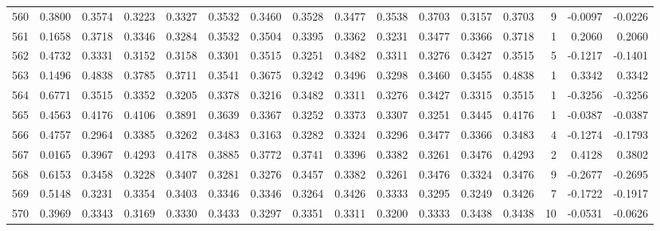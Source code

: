 \begin{tabular}{lrrrrrrrrrrrrrrr}
560 &      0.3800 &  0.3574 &  0.3223 &  0.3327 &  0.3532 &  0.3460 &  0.3528 &  0.3477 &  0.3538 &  0.3703 &   0.3157 &     0.3703 &      9 &                   -0.0097 &                    -0.0226 \\
561 &      0.1658 &  0.3718 &  0.3346 &  0.3284 &  0.3532 &  0.3504 &  0.3395 &  0.3362 &  0.3231 &  0.3477 &   0.3366 &     0.3718 &      1 &                    0.2060 &                     0.2060 \\
562 &      0.4732 &  0.3331 &  0.3152 &  0.3158 &  0.3301 &  0.3515 &  0.3251 &  0.3482 &  0.3311 &  0.3276 &   0.3427 &     0.3515 &      5 &                   -0.1217 &                    -0.1401 \\
563 &      0.1496 &  0.4838 &  0.3785 &  0.3711 &  0.3541 &  0.3675 &  0.3242 &  0.3496 &  0.3298 &  0.3460 &   0.3455 &     0.4838 &      1 &                    0.3342 &                     0.3342 \\
564 &      0.6771 &  0.3515 &  0.3352 &  0.3205 &  0.3378 &  0.3216 &  0.3482 &  0.3311 &  0.3276 &  0.3427 &   0.3315 &     0.3515 &      1 &                   -0.3256 &                    -0.3256 \\
565 &      0.4563 &  0.4176 &  0.4106 &  0.3891 &  0.3639 &  0.3367 &  0.3252 &  0.3373 &  0.3307 &  0.3251 &   0.3445 &     0.4176 &      1 &                   -0.0387 &                    -0.0387 \\
566 &      0.4757 &  0.2964 &  0.3385 &  0.3262 &  0.3483 &  0.3163 &  0.3282 &  0.3324 &  0.3296 &  0.3477 &   0.3366 &     0.3483 &      4 &                   -0.1274 &                    -0.1793 \\
567 &      0.0165 &  0.3967 &  0.4293 &  0.4178 &  0.3885 &  0.3772 &  0.3741 &  0.3396 &  0.3382 &  0.3261 &   0.3476 &     0.4293 &      2 &                    0.4128 &                     0.3802 \\
568 &      0.6153 &  0.3458 &  0.3228 &  0.3407 &  0.3281 &  0.3276 &  0.3457 &  0.3382 &  0.3261 &  0.3476 &   0.3324 &     0.3476 &      9 &                   -0.2677 &                    -0.2695 \\
569 &      0.5148 &  0.3231 &  0.3354 &  0.3403 &  0.3346 &  0.3346 &  0.3264 &  0.3426 &  0.3333 &  0.3295 &   0.3249 &     0.3426 &      7 &                   -0.1722 &                    -0.1917 \\
570 &      0.3969 &  0.3343 &  0.3169 &  0.3330 &  0.3433 &  0.3297 &  0.3351 &  0.3311 &  0.3200 &  0.3333 &   0.3438 &     0.3438 &     10 &                   -0.0531 &                    -0.0626 \\

\end{tabular}
